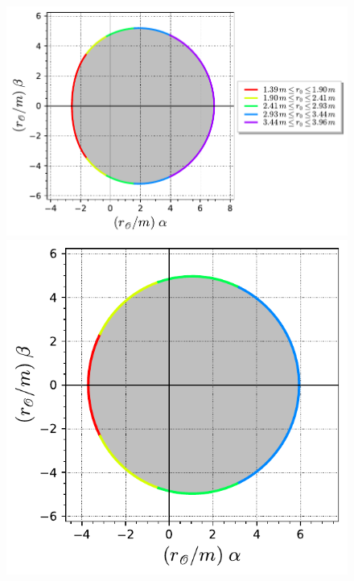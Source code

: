 \begin{figure}
\begin{center}
\includegraphics[height=0.28\textheight]{gik_shadow_a95_th90.pdf} \\[1ex]
\includegraphics[height=0.28\textheight]{gik_shadow_a95_th30.pdf}\qquad

\end{center}
\end{figure}
